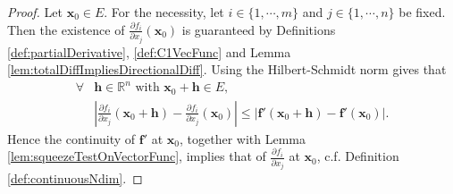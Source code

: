 \begin{proof}
  Let $\mathbf{x}_{0}\in E$.
  For the necessity,
  let $i\in\{1,\cdots,m\}$ and $j\in\{1,\cdots,n\}$ be fixed.
  Then the existence of
  $\frac{\partial f_{i}}{\partial x_{j}}(\mathbf{x}_{0})$ is guaranteed by
  Definitions \ref{def:partialDerivative}, \ref{def:C1VecFunc} and
  Lemma \ref{lem:totalDiffImpliesDirectionalDiff}. 
  Using the Hilbert-Schmidt norm gives that
  \begin{align*}
    \forall &\mathbf{h}\in \mathbb{R}^{n}\text{ with }
    \mathbf{x}_{0}+\mathbf{h}\in E,\\
    &\left|\frac{\partial f_{i}}{\partial x_{j}}(\mathbf{x}_{0}+\mathbf{h})
    -\frac{\partial f_{i}}{\partial x_{j}}(\mathbf{x}_{0})\right|
    \le |\mathbf{f}'(\mathbf{x}_{0}+\mathbf{h})-\mathbf{f}'(\mathbf{x}_{0})|.
  \end{align*}
  Hence 
  the continuity of $\mathbf{f}'$ at $\mathbf{x}_{0}$,
  together with Lemma \ref{lem:squeezeTestOnVectorFunc}, implies
  that of $\frac{\partial f_{i}}{\partial x_{j}}$ at $\mathbf{x}_{0}$,
  c.f. Definition \ref{def:continuousNdim}.


\end{proof}

